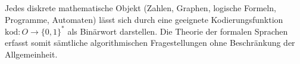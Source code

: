 \begin{remark}
    Jedes diskrete mathematische Objekt (Zahlen, Graphen, logische Formeln, Programme, Automaten) lässt sich durch eine geeignete Kodierungsfunktion $\mathrm{kod} : O \to \{0, 1\}^*$ als Binärwort darstellen. Die Theorie der formalen Sprachen erfasst somit sämtliche algorithmischen Fragestellungen ohne Beschränkung der Allgemeinheit.
\end{remark}
